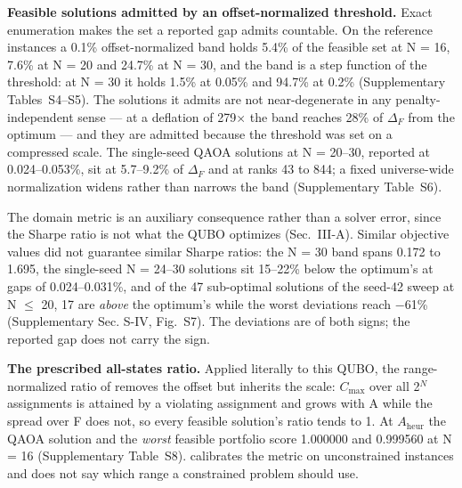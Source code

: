 \documentclass{ieeeaccess}
\begin{document}
\textbf{Feasible solutions admitted by an offset-normalized threshold.} Exact enumeration makes the set a reported gap admits countable. On the reference instances a 0.1\% offset-normalized band holds 5.4\% of the feasible set at N = 16, 7.6\% at N = 20 and 24.7\% at N = 30, and the band is a step function of the threshold: at N = 30 it holds 1.5\% at 0.05\% and 94.7\% at 0.2\% (Supplementary Tables~S4--S5). The solutions it admits are not near-degenerate in any penalty-independent sense --- at a deflation of 279$\times$ the band reaches 28\% of $\Delta_{F}$ from the optimum --- and they are admitted because the threshold was set on a compressed scale. The single-seed QAOA solutions at N = 20--30, reported at 0.024--0.053\%, sit at 5.7--9.2\% of $\Delta_{F}$ and at ranks 43 to 844; a fixed universe-wide normalization widens rather than narrows the band (Supplementary Table~S6).


The domain metric is an auxiliary consequence rather than a solver error, since the Sharpe ratio is not what the QUBO optimizes (Sec.~III-A). Similar objective values did not guarantee similar Sharpe ratios: the N = 30 band spans 0.172 to 1.695, the single-seed N = 24--30 solutions sit 15--22\% below the optimum's at gaps of 0.024--0.031\%, and of the 47 sub-optimal solutions of the seed-42 sweep at N $\leq$ 20, 17 are \textit{above} the optimum's while the worst deviations reach $-$61\% (Supplementary Sec. S-IV, Fig.~S7). The deviations are of both signs; the reported gap does not carry the sign.


\textbf{The prescribed all-states ratio.} Applied literally to this QUBO, the range-normalized ratio of \cite{ref19} removes the offset but inherits the scale: $C_{\mathrm{max}}$ over all 2$^{N}$ assignments is attained by a violating assignment and grows with A while the spread over F does not, so every feasible solution's ratio tends to 1. At $A_{\mathrm{heur}}$ the QAOA solution and the \textit{worst} feasible portfolio score 1.000000 and 0.999560 at N = 16 (Supplementary Table~S8). \cite{ref19} calibrates the metric on unconstrained instances and does not say which range a constrained problem should use.
\end{document}
